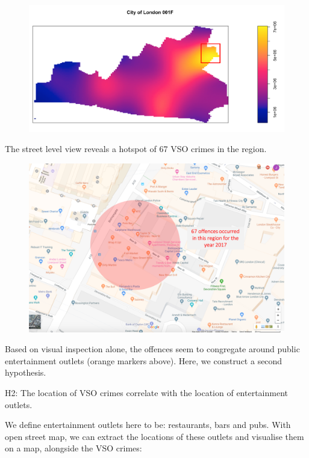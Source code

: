 \documentclass[]{article}
\begin{document}
\begin{figure}
\centering
\includegraphics{pictures/COL001F_Hotspot_box.png}
\caption{}
\end{figure}

The street level view reveals a hotspot of 67 VSO crimes in the region.

\begin{figure}
\centering
\includegraphics{pictures/COL001F_Hotspot.png}
\caption{}
\end{figure}

Based on visual inspection alone, the offences seem to congregate around
public entertainment outlets (orange markers above). Here, we construct
a second hypothesis.

H2: The location of VSO crimes correlate with the location of
entertainment outlets.

We define entertainment outlets here to be: restaurants, bars and pubs.
With open street map, we can extract the locations of these outlets and
visualise them on a map, alongside the VSO crimes:
\end{document}
